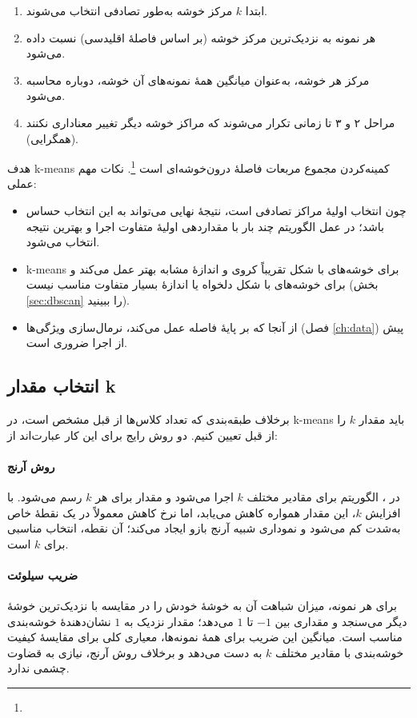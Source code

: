 \begin{enumerate}
    \item ابتدا $k$ مرکز خوشه به‌طور تصادفی انتخاب می‌شوند.
    \item هر نمونه به نزدیک‌ترین مرکز خوشه (بر اساس فاصلهٔ اقلیدسی)
          نسبت داده می‌شود.
    \item مرکز هر خوشه، به‌عنوان میانگین همهٔ نمونه‌های آن خوشه، دوباره
          محاسبه می‌شود.
    \item مراحل ۲ و ۳ تا زمانی تکرار می‌شوند که مراکز خوشه دیگر تغییر
          معناداری نکنند (همگرایی).
\end{enumerate}

هدف k-means کمینه‌کردن مجموع مربعات فاصلهٔ درون‌خوشه‌ای است
\footnote{}. نکات مهم عملی:

\begin{itemize}
    \item چون انتخاب اولیهٔ مراکز تصادفی است، نتیجهٔ نهایی می‌تواند به
          این انتخاب حساس باشد؛ در عمل الگوریتم چند بار با مقداردهی
          اولیهٔ متفاوت اجرا و بهترین نتیجه انتخاب می‌شود.
    \item k-means برای خوشه‌های با شکل تقریباً کروی و اندازهٔ مشابه بهتر
          عمل می‌کند و برای خوشه‌های با شکل دلخواه یا اندازهٔ بسیار
          متفاوت مناسب نیست (بخش \ref{sec:dbscan} را ببینید).
    \item از آنجا که بر پایهٔ فاصله عمل می‌کند، نرمال‌سازی ویژگی‌ها
          (فصل \ref{ch:data}) پیش از اجرا ضروری است.
\end{itemize}

\subsection{انتخاب مقدار k}

برخلاف طبقه‌بندی که تعداد کلاس‌ها از قبل مشخص است، در k-means باید
مقدار $k$ را از قبل تعیین کنیم. دو روش رایج برای این کار عبارت‌اند از:

\paragraph{روش آرنج}
در ، الگوریتم برای مقادیر
مختلف $k$ اجرا می‌شود و مقدار  برای هر $k$ رسم می‌شود. با
افزایش $k$، این مقدار همواره کاهش می‌یابد، اما نرخ کاهش معمولاً در یک
نقطهٔ خاص به‌شدت کم می‌شود و نموداری شبیه آرنج بازو ایجاد می‌کند؛ آن
نقطه، انتخاب مناسبی برای $k$ است.

\paragraph{ضریب سیلوئت}
 برای هر نمونه،
میزان شباهت آن به خوشهٔ خودش را در مقایسه با نزدیک‌ترین خوشهٔ دیگر
می‌سنجد و مقداری بین $-1$ تا $1$ می‌دهد؛ مقدار نزدیک به $1$ نشان‌دهندهٔ
خوشه‌بندی مناسب است. میانگین این ضریب برای همهٔ نمونه‌ها، معیاری کلی
برای مقایسهٔ کیفیت خوشه‌بندی با مقادیر مختلف $k$ به دست می‌دهد و
برخلاف روش آرنج، نیازی به قضاوت چشمی ندارد.

